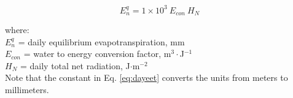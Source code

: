 \begin{equation}
\label{eq:dayeet}
	E^q_n = 1\times 10^3\: E_{con}\: H_N
\end{equation}

\noindent where:\\
\indent $E^q_n$ = daily equilibrium evapotranspiration, mm\\
\indent $E_{con}$ = water to energy conversion factor, m$^{3}\cdot$J$^{-1}$\\
\indent $H_N$ = daily total net radiation, J$\cdot$m$^{-2}$ \\

\noindent Note that the constant in Eq. \ref{eq:dayeet} converts the units from meters to millimeters.

